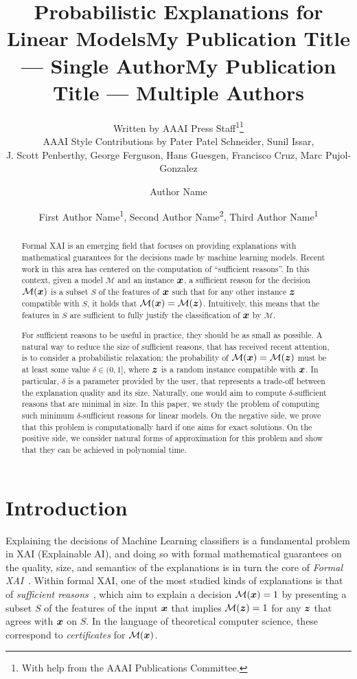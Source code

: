 \documentclass[letterpaper]{article} %
\title{Probabilistic Explanations for Linear Models}
\author{
    Written by AAAI Press Staff\textsuperscript{\rm 1}\thanks{With help from the AAAI Publications Committee.}\\
    AAAI Style Contributions by Pater Patel Schneider,
    Sunil Issar,\\
    J. Scott Penberthy,
    George Ferguson,
    Hans Guesgen,
    Francisco Cruz\equalcontrib,
    Marc Pujol-Gonzalez\equalcontrib
}
\title{My Publication Title --- Single Author}
\author {
    Author Name
}
\title{My Publication Title --- Multiple Authors}
\author {
    First Author Name\textsuperscript{\rm 1},
    Second Author Name\textsuperscript{\rm 2},
    Third Author Name\textsuperscript{\rm 1}
}
\newcommand{\M}{\mathcal{M}}
\begin{document}
\maketitle

\begin{abstract}
Formal XAI is an emerging field that focuses on providing explanations
with mathematical guarantees for the decisions made by machine
learning models. Recent work in this area has centered on the
computation of ``sufficient reasons''. In this context, given a model $\M$
and an instance ${\bm{x}}$, a sufficient reason for the decision $\M(\vx)$ is a
subset $S$ of the features of ${\bm{x}}$ such that for any other instance ${\bm{z}}$
compatible with $S$, it holds that $\M(\vx) = \M(\vz)$. Intuitively, this means
that the features in $S$ are sufficient to fully justify the
classification of ${\bm{x}}$ by $\M$.

For sufficient reasons to be useful in practice, they should be as
small as possible. A natural way to reduce the size of sufficient
reasons, that has received recent attention, is to consider a
probabilistic relaxation; the probability of $\M(\vx) = \M(\vz)$ must
be at least some value $\delta \in (0,1]$, where ${\bm{z}}$ is a random
  instance compatible with ${\bm{x}}$. In particular, $\delta$ is a
  parameter provided by the user, that represents a trade-off between
  the explanation quality and its size. Naturally, one would aim to
  compute $\delta$-sufficient reasons that are minimal in size. In this
  paper, we study the problem of computing such minimum
  $\delta$-sufficient reasons for linear models. On the negative side, we
  prove that this problem is computationally hard if one aims for
  exact solutions. On the positive side, we consider natural forms of
  approximation for this problem and show that they can be achieved in
  polynomial time.
\end{abstract}


\section{Introduction}

Explaining the decisions of Machine Learning classifiers is a fundamental problem in XAI (Explainable AI), and doing so with formal mathematical guarantees on the quality, size, and semantics of the explanations is in turn the core of \emph{Formal XAI}~\cite{formal-xai}. 
Within formal XAI, one of the most studied kinds of explanations is that of \emph{sufficient reasons}~\cite{Darwiche_Hirth_2020}, which aim to explain a decision $\M(\vx) = 1$ by presenting a subset $S$ of the features of the input ${\bm{x}}$ that implies $\M(\vz) = 1$  for any ${\bm{z}}$ that agrees with ${\bm{x}}$ on $S$. 
In the language of theoretical computer science, these correspond to \emph{certificates} for $\M(\vx)$.
\end{document}
